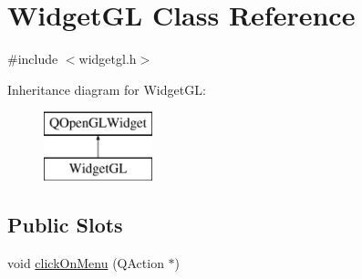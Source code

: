 \hypertarget{class_widget_g_l}{}\section{Widget\+GL Class Reference}
\label{class_widget_g_l}


{\ttfamily \#include $<$widgetgl.\+h$>$}

Inheritance diagram for Widget\+GL\+:\begin{figure}[H]
\begin{center}
\leavevmode
\includegraphics[height=2.000000cm]{class_widget_g_l}
\end{center}
\end{figure}
\subsection*{Public Slots}
\begin{DoxyCompactItemize}
\item 
void \mbox{\hyperlink{class_widget_g_l_ad3cc6174d1701a50ce9c099f735e24f6}{click\+On\+Menu}} (Q\+Action $\ast$)
\end{DoxyCompactItemize}
